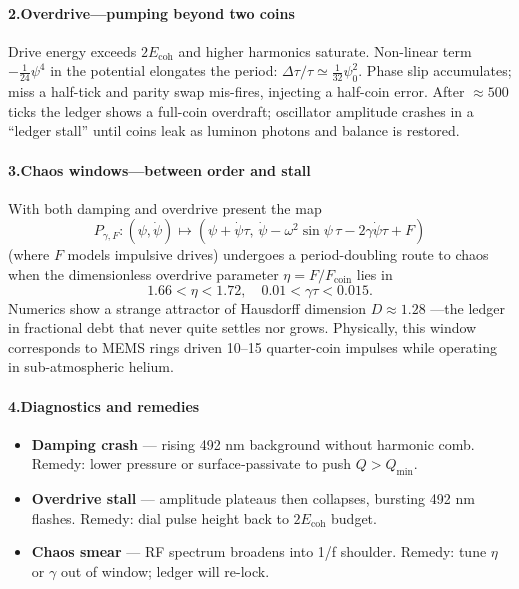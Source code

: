 \documentclass[11pt,oneside]{book}
\begin{document}
\paragraph*{2.\;Overdrive—pumping beyond two coins}

Drive energy exceeds $2E_{\text{coh}}$ and higher harmonics saturate.  
Non-linear term $-\tfrac1{24}\psi^{4}$ in the potential elongates the
period:
\(
  \Delta\tau/\tau \simeq \tfrac1{32}\psi_{0}^{2}.
\)
Phase slip accumulates; miss a half-tick and parity swap mis-fires,
injecting a half-coin error.  
After $\approx 500$ ticks the ledger shows a full-coin overdraft;
oscillator amplitude crashes in a “ledger stall” until coins leak as
luminon photons and balance is restored.

\paragraph*{3.\;Chaos windows—between order and stall}

With both damping and overdrive present the map
\[
  P_{\gamma,F}\!: (\psi,\dot\psi)\longmapsto
                  (\psi+\dot\psi\tau,\,
                   \dot\psi-\omega^{2}\sin\psi\,\tau - 2\gamma\dot\psi\tau + F)
\]
(where $F$ models impulsive drives) undergoes a period-doubling route to
chaos when the dimensionless overdrive parameter
\(
  \eta = F/F_{\text{coin}}
\)
lies in
\[
  1.66 < \eta < 1.72, \quad 0.01<\gamma\tau<0.015.
\]
Numerics show a strange attractor of Hausdorff dimension $D\approx 1.28$
—the ledger in fractional debt that never quite settles nor grows.
Physically, this window corresponds to MEMS rings driven 10–15 %
quarter-coin impulses while operating in sub-atmospheric helium.

\paragraph*{4.\;Diagnostics and remedies}

\begin{itemize}
\item \textbf{Damping crash} — rising 492 nm background without harmonic comb.  
  Remedy: lower pressure or surface‐passivate to push $Q>Q_{\min}$.
\item \textbf{Overdrive stall} — amplitude plateaus then collapses, bursting 492 nm flashes.  
  Remedy: dial pulse height back to $2E_{\text{coh}}$ budget.
\item \textbf{Chaos smear} — RF spectrum broadens into 1/f shoulder.  
  Remedy: tune $\eta$ or $\gamma$ out of window; ledger will re-lock.
\end{itemize}
\end{document}
